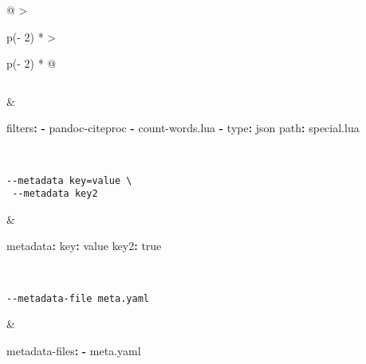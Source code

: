 \documentclass[
]{article}
\newenvironment{Shaded}{}{}
\newcommand{\AttributeTok}[1]{\textcolor[rgb]{0.49,0.56,0.16}{#1}}
\newcommand{\CharTok}[1]{\textcolor[rgb]{0.25,0.44,0.63}{#1}}
\newcommand{\FunctionTok}[1]{\textcolor[rgb]{0.02,0.16,0.49}{#1}}
\newcommand{\KeywordTok}[1]{\textcolor[rgb]{0.00,0.44,0.13}{\textbf{#1}}}
\begin{document}
\begin{longtable}[]{@{}
  >{\raggedright\arraybackslash}p{(\columnwidth - 2\tabcolsep) * }
  >{\raggedright\arraybackslash}p{(\columnwidth - 2\tabcolsep) * }@{}}
\begin{minipage}[t]{\linewidth}
\begin{verbatim}
\end{verbatim}
\end{minipage} & \begin{minipage}[t]{\linewidth}\raggedright
\begin{Shaded}
\begin{Highlighting}[]
\FunctionTok{filters}\KeywordTok{:}
\AttributeTok{  }\KeywordTok{{-}}\AttributeTok{ pandoc{-}citeproc}
\AttributeTok{  }\KeywordTok{{-}}\AttributeTok{ count{-}words.lua}
\AttributeTok{  }\KeywordTok{{-}}\AttributeTok{ }\FunctionTok{type}\KeywordTok{:}\AttributeTok{ json}
\AttributeTok{    }\FunctionTok{path}\KeywordTok{:}\AttributeTok{ special.lua}
\end{Highlighting}
\end{Shaded}
\end{minipage} \\
\begin{minipage}[t]{\linewidth}\raggedright
\begin{verbatim}
--metadata key=value \
 --metadata key2
\end{verbatim}
\end{minipage} & \begin{minipage}[t]{\linewidth}\raggedright
\begin{Shaded}
\begin{Highlighting}[]
\FunctionTok{metadata}\KeywordTok{:}
\AttributeTok{  }\FunctionTok{key}\KeywordTok{:}\AttributeTok{ value}
\AttributeTok{  }\FunctionTok{key2}\KeywordTok{:}\AttributeTok{ }\CharTok{true}
\end{Highlighting}
\end{Shaded}
\end{minipage} \\
\begin{minipage}[t]{\linewidth}\raggedright
\begin{verbatim}
--metadata-file meta.yaml
\end{verbatim}
\end{minipage} & \begin{minipage}[t]{\linewidth}\raggedright
\begin{Shaded}
\begin{Highlighting}[]
\FunctionTok{metadata{-}files}\KeywordTok{:}
\AttributeTok{  }\KeywordTok{{-}}\AttributeTok{ meta.yaml}
\end{Highlighting}
\end{Shaded}


\end{minipage}
\end{longtable}
\end{document}
